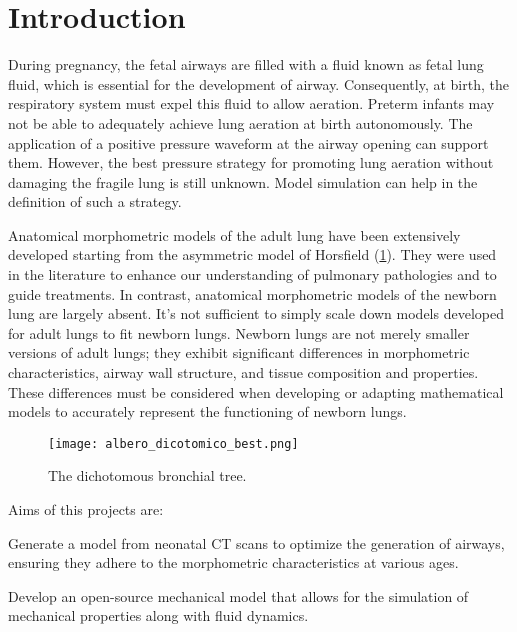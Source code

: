 \section{Introduction}
\label{sec:introduction}
During pregnancy, the fetal airways are filled with a fluid known as
fetal lung fluid, which is essential for the development of
airway. Consequently, at birth, the respiratory system must expel this
fluid to allow aeration. Preterm infants may not be able to adequately
achieve lung aeration at birth autonomously. The application of a
positive pressure waveform at the airway opening can support
them. However, the best pressure strategy for promoting lung aeration
without damaging the fragile lung is still unknown. Model simulation
can help in the definition of such a strategy.


Anatomical morphometric models of the adult lung have been extensively
developed starting from the asymmetric model of Horsfield
(\cref{fig:albero_dicotomico_anatomical}). They were used in the
literature to enhance our understanding of pulmonary pathologies and
to guide treatments. In contrast, anatomical morphometric models of
the newborn lung are largely absent. It's not sufficient to simply
scale down models developed for adult lungs to fit newborn
lungs. Newborn lungs are not merely smaller versions of adult lungs;
they exhibit significant differences in morphometric characteristics,
airway wall structure, and tissue composition and properties. These
differences must be considered when developing or adapting
mathematical models to accurately represent the functioning of newborn
lungs.

\begin{figure}[H]\centering
  \texttt{[image: albero\_dicotomico\_best.png]}
  \caption{The dichotomous bronchial tree.}
  \label{fig:albero_dicotomico_anatomical}
\end{figure}

Aims of this projects are:
\begin{description}
\item Generate a model from neonatal CT scans to optimize the
  generation of airways, ensuring they adhere to the morphometric
  characteristics at various ages.
\item Develop an open-source mechanical model that allows for the
  simulation of mechanical properties along with fluid dynamics.
\end{description}

